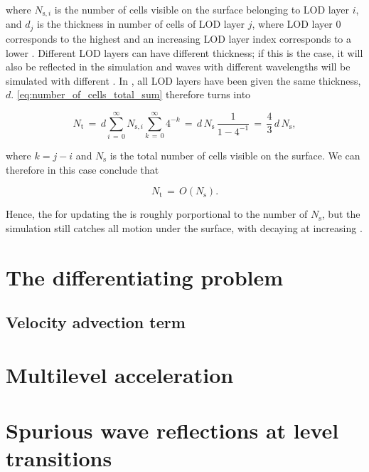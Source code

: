 where $N_{\text{s},i}$ is the number of cells visible on the surface belonging to LOD layer $i$, and $d_j$ is the thickness in number of cells of LOD layer $j$, where LOD layer $0$ corresponds to the highest \LOD and an increasing LOD layer index corresponds to a lower \LOD. Different LOD layers can have different thickness; if this is the case, it will also be reflected in the simulation and waves with different wavelengths will be simulated with different \accuracy. In \thiswork, all LOD layers have been given the same thickness, $d$. \eqref{eq:number_of_cells_total_sum} therefore turns into

\begin{equation} \label{eq:number_of_cells_total}
N_{\text{t}} \,=\, d\sum_{i\,=\,0}^\infty N_{\text{s},i}\sum_{k\,=\,0}^\infty 4^{-k} \,=\, d\,N_{\text{s}}\,\frac{1}{1-4^{-1}} \,=\, \frac{4}{3}\,d\,N_{\text{s}},
\end{equation}

where $k = j-i$ and $N_{\text{s}}$ is the total number of cells visible on the surface. We can therefore in this case conclude that

\begin{equation} \label{eq:number_of_cells_total_ordo}
N_{\text{t}} \,=\, O(N_{\text{s}}).
\end{equation}

Hence, the  for updating the  is roughly porportional to the number of  $N_{\text{s}}$, but the simulation still catches all motion under the surface, with decaying \precision at increasing .

\section{The differentiating problem}

\subsection{Velocity advection term}

\section{Multilevel acceleration}

\section{Spurious wave reflections at level transitions}